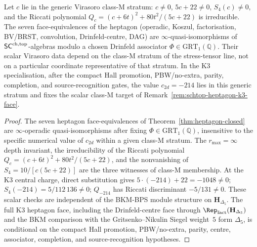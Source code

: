 \begin{proposition}
\label{prop:schtop-heptagon-classM-stratum}
Let $c$ lie in the generic Virasoro class-$\mathrm M$ stratum:
$c\neq 0$, $5c+22\neq 0$, $S_4(c)\neq 0$, and the Riccati polynomial
$Q_c=(c+6t)^2+80t^2/(5c+22)$ is irreducible. The seven
face-equivalences of the heptagon (operadic, Koszul,
factorisation, BV/BRST, convolution, Drinfeld-centre, DAG) are
$\infty$-quasi-isomorphisms of $\mathsf{SC}^{\mathrm{ch},\mathrm{top}}$-algebras modulo a chosen
Drinfeld associator $\Phi \in \mathrm{GRT}_1(\mathbb Q)$. Their scalar
Virasoro data depend on the class-$\mathrm M$ stratum of the
stress-tensor line, not on a particular coordinate representative of
that stratum. In the K3 specialisation, after the compact Hall
promotion, PBW/no-extra, parity, completion, and source-recognition
gates, the value $c_{2d}=-214$ lies in this generic stratum and fixes
the scalar class-$\mathrm M$ target of
Remark~\ref{rem:schtop-heptagon-k3-face}.
\end{proposition}

\begin{proof}
The seven heptagon face-equivalences of
Theorem~\ref{thm:heptagon-closed} are $\infty$-operadic
quasi-isomorphisms after fixing
$\Phi \in \mathrm{GRT}_1(\mathbb Q)$, insensitive to the specific
numerical value of $c_{2d}$ within a given class-$\mathrm M$ stratum.
The $r_{\max} = \infty$ depth invariant, the irreducibility of the
Riccati polynomial $Q_c = (c + 6t)^2 + 80 t^2/(5c + 22)$, and the
nonvanishing of $S_4 = 10/[c(5c + 22)]$ are the three witnesses of
class-$\mathrm M$ membership.  At the K3 central charge,
direct substitution gives
$5\cdot(-214) + 22 = -1048 \ne 0$;
$S_4(-214) = 5/112\,136 \ne 0$; $Q_{-214}$ has Riccati
discriminant $-5/131 \ne 0$. These scalar checks are independent of
the BKM-BPS module structure on $\mathbf H_{\Delta_5}$. The full K3
heptagon face, including the Drinfeld-centre face through
$\Rep_{\mathrm{fact}}(\mathbf H_{\Delta_5})$ and the BKM comparison
with the Gritsenko--Nikulin Siegel weight~$5$ form $\Delta_5$, is
conditional on the compact Hall promotion, PBW/no-extra, parity,
centre, associator, completion, and source-recognition hypotheses.
\end{proof}

